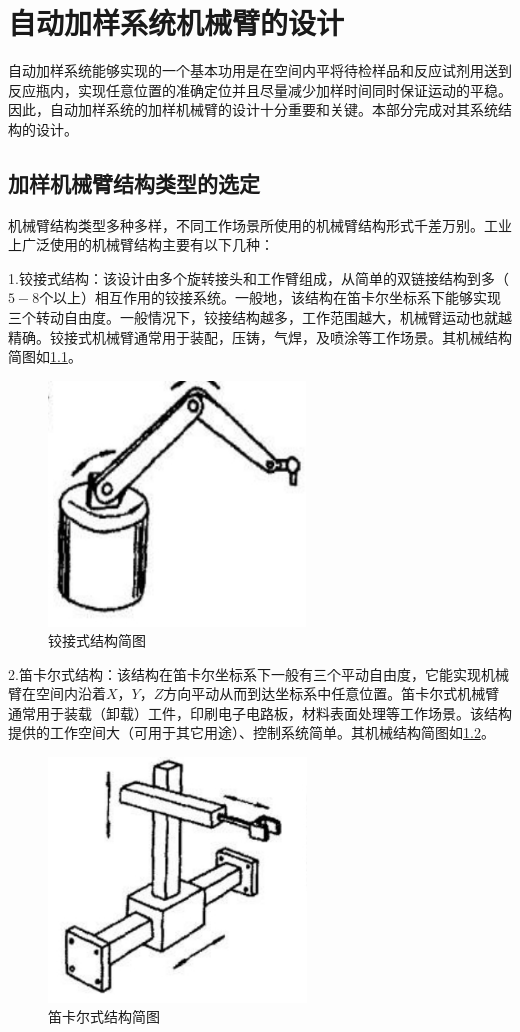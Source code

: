 \chapter{自动加样系统机械臂的设计}
自动加样系统能够实现的一个基本功用是在空间内平将待检样品和反应试剂用送到反应瓶内，实现任意位置的准确定位并且尽量减少加样时间同时保证运动的平稳。因此，自动加样系统的加样机械臂的设计十分重要和关键。本部分完成对其系统结构的设计。
\section{加样机械臂结构类型的选定}
机械臂结构类型多种多样，不同工作场景所使用的机械臂结构形式千差万别。工业上广泛使用的机械臂结构主要有以下几种：

1.铰接式结构：该设计由多个旋转接头和工作臂组成，从简单的双链接结构到多（$5-8$个以上）相互作用的铰接系统。一般地，该结构在笛卡尔坐标系下能够实现三个转动自由度。一般情况下，铰接结构越多，工作范围越大，机械臂运动也就越精确。铰接式机械臂通常用于装配，压铸，气焊，及喷涂等工作场景。其机械结构简图如\ref{fig:3-1}。

\begin{figure}[htbp!]
	\centering
	\includegraphics[height=6.5cm]{chap/figure/3-1.jpg}
	\caption{铰接式结构简图}
	\label{fig:3-1}
\end{figure}

2.笛卡尔式结构：该结构在笛卡尔坐标系下一般有三个平动自由度，它能实现机械臂在空间内沿着$X，Y，Z$方向平动从而到达坐标系中任意位置。笛卡尔式机械臂通常用于装载（卸载）工件，印刷电子电路板，材料表面处理等工作场景。该结构提供的工作空间大（可用于其它用途）、控制系统简单。其机械结构简图如\ref{fig:3-2}。

\begin{figure}[htbp!]
	\centering
	\includegraphics[height=6.5cm]{chap/figure/3-2.jpg}
	\caption{笛卡尔式结构简图}
	\label{fig:3-2}
\end{figure}

